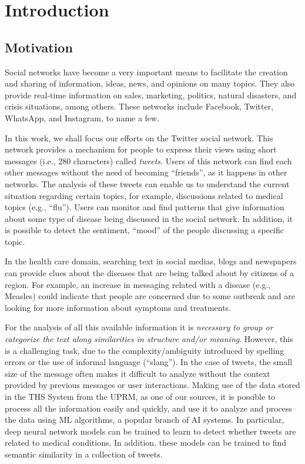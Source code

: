 \documentclass[12pt]{report}
\begin{document}
	\chapter{Introduction}\label{Chapter 1}
	\doublespacing
	
	\section{Motivation}
	Social networks have become a very important means to facilitate the creation and sharing of information, ideas, news, and opinions on many topics.  They also provide real-time information on sales, marketing, politics, natural disasters, and crisis situations, among others. These networks include Facebook, Twitter, WhatsApp, and Instagram, to name a few. 
	
	In this work, we shall focus our efforts on the Twitter social network. This network provides a mechanism for people to express their views using short messages (i.e., 280 characters)
	called {\em tweets}. 
	Users of this network can find each other messages without the need of becoming ``friends'', as it happens in other networks. The analysis of these tweets can enable us to understand the current situation regarding certain topics, for example, discussions related to medical topics (e.g., ``flu'').
	Users can monitor and find patterns that give information about some type of disease being discussed in the social network. In addition, it is possible to detect the sentiment, ``mood'' of the people discussing a specific topic.

	In the health care domain, searching text in social medias, blogs and newspapers can provide clues about the diseases that are being talked about 
	by citizens of a region. For example, an increase in messaging related with a disease (e.g., Measles) could indicate that people are concerned 
	due to some outbreak and are looking for more information about symptoms and treatments. 
		
	For the analysis of all this available information it is {\em necessary to group or categorize the text along similarities in structure and/or meaning}. However, this is a challenging task, due to the complexity/ambiguity introduced by  spelling errors or the use of informal language (``slang'').  In the case of tweets, the small size of the message often makes it difficult to analyze without the context provided by previous messages or user interactions. Making use of the data stored in the  \ac{THS} System from the \ac{UPRM}, as one of our sources, it is possible to process all the information easily and quickly, and use it to analyze and process the data using  \ac{ML} algorithms, a popular branch of \ac{AI} systems. In particular, deep neural network models can be trained to learn to detect whether tweets are related to  medical conditions. In addition, these models can be trained to  find semantic similarity in a collection of tweets.
	
\end{document}
